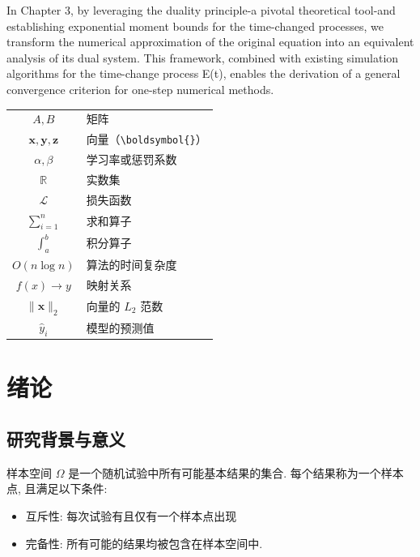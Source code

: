 \documentclass[bibbackend=biber]{csuthesis}
\theoremstyle{csutheorem}
\begin{document}
\begin{csuconfig}
\begin{enabstract}
        In Chapter 3, by leveraging the duality principle-a pivotal theoretical tool-and
        establishing exponential moment bounds for the time-changed processes,
        we transform the numerical approximation of the original equation into an
        equivalent analysis of its dual system. This framework, combined with existing simulation algorithms for the time-change process E(t), enables the
        derivation of a general convergence criterion for one-step numerical methods.
    \end{enabstract}
    \makecsutoc
    \begin{csusymbols}
        \begin{longtable}{c p{}}
            $A, B$          & 矩阵 \\
            $\boldsymbol{x}, {\bm{y}}, \mathbf{z}$ & 向量（\verb|\boldsymbol{}|） \\
            $\alpha, \beta$  & 学习率或惩罚系数 \\
            $\mathbb{R}$    & 实数集 \\
            $\mathcal{L}$   & 损失函数 \\
            $\sum_{i=1}^{n}$ & 求和算子 \\
            $\int_{a}^{b}$  & 积分算子 \\
            $O(n \log n)$   & 算法的时间复杂度 \\
            $f(x) \to y$    & 映射关系 \\
            $\|\boldsymbol{x}\|_2$ & 向量的 $L_2$ 范数 \\
            $\hat{y}_i$     & 模型的预测值 \\ 
        \end{longtable}
    \end{csusymbols}
\end{csuconfig}

\csucontentstart
\chapter{绪论}
\zhlipsum[1] %
\section{研究背景与意义}
\zhlipsum[3]
\zhlipsum[3]
\begin{Definition}[样本空间]
    样本空间 $\Omega$ 是一个随机试验中所有可能基本结果的集合. 每个结果称为一个样本点, 且满足以下条件:
    \begin{itemize}
        \item 互斥性: 每次试验有且仅有一个样本点出现
        \item 完备性: 所有可能的结果均被包含在样本空间中.
    \end{itemize}
\end{Definition} 
\end{document}
